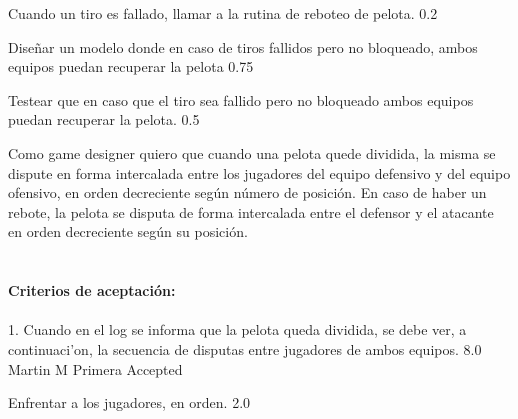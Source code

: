 		{Cuando un tiro es fallado, llamar a la rutina de reboteo de pelota.} %
		{} %
		{0.2} %
		{} %
		{} %
		{} %

		{Diseñar un modelo donde en caso de tiros fallidos pero no bloqueado, ambos equipos puedan recuperar la pelota} %
		{} %
		{0.75} %
		{} %
		{} %
		{} %

		{Testear que en caso que el tiro sea fallido pero no bloqueado ambos equipos puedan recuperar la pelota.} %
		{} %
		{0.5} %
		{} %
		{} %
		{} %

\vspace{20pt}


	{Como game designer quiero que cuando una pelota quede dividida, la misma se dispute en forma intercalada entre los jugadores del equipo defensivo y del equipo ofensivo, en orden decreciente seg\'un n\'umero de posici\'on.} %
	{En caso de haber un rebote, la pelota se disputa de forma intercalada entre el defensor y el atacante en orden decreciente según su posición. \\
  \\
  \\
\textbf{Criterios de aceptación:}\\
  \\
1. Cuando en el log se informa que la pelota queda dividida, se debe ver, a continuaci'on, la secuencia de disputas entre jugadores de ambos equipos.
} %
	{} %
	{8.0} %
	{Martin M} %
	{Primera} %
	{Accepted} %

		{Enfrentar a los jugadores, en orden.} %
		{} %
		{2.0} %
		{} %
		{} %
		{} %
\vspace{20pt}


